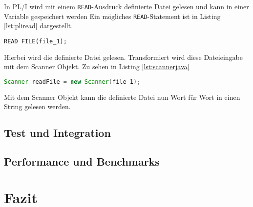 In PL/I wird mit einem \verb+READ+-Ausdruck definierte Datei gelesen und kann in einer Variable gespeichert werden
Ein mögliches \verb+READ+-Statement ist in Listing \ref{lst:pliread} dargestellt.

\begin{lstlisting}[language=PL/I, caption=READ Statement in PL/I, label={lst:pliread}]
READ FILE(file_1); 
\end{lstlisting} 

Hierbei wird die definierte Datei gelesen.
Transformiert wird diese Dateieingabe mit dem Scanner Objekt. Zu sehen in Listing \ref{lst:scannerjava}

\begin{lstlisting}[language=Java, caption=Scanner Objekt in Java, label={lst:scannerjava}]
Scanner readFile = new Scanner(file_1);
\end{lstlisting} 

Mit dem Scanner Objekt kann die definierte Datei nun Wort für Wort in einen String gelesen werden.

\pagebreak
\subsection{Test und Integration}



\subsection{Performance und Benchmarks}

\section{Fazit}